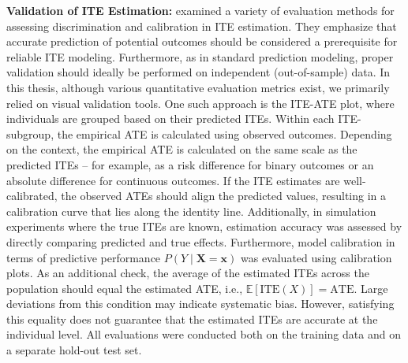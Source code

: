 \textbf{Validation of ITE Estimation:} \label{sec:ite_validation} \citet{hoogland2024} examined a variety of evaluation methods for assessing discrimination and calibration in ITE estimation. They emphasize that accurate prediction of potential outcomes should be considered a prerequisite for reliable ITE modeling. Furthermore, as in standard prediction modeling, proper validation should ideally be performed on independent (out-of-sample) data.
In this thesis, although various quantitative evaluation metrics exist, we primarily relied on visual validation tools. One such approach is the ITE-ATE plot, where individuals are grouped based on their predicted ITEs. Within each ITE-subgroup, the empirical ATE is calculated using observed outcomes. Depending on the context, the empirical ATE is calculated on the same scale as the predicted ITEs -- for example, as a risk difference for binary outcomes or an absolute difference for continuous outcomes. If the ITE estimates are well-calibrated, the observed ATEs should align the predicted values, resulting in a calibration curve that lies along the identity line. Additionally, in simulation experiments where the true ITEs are known, estimation accuracy was assessed by directly comparing predicted and true effects. Furthermore, model calibration in terms of predictive performance $P(Y \mid \mathbf{X} = \mathbf{x})$ was evaluated using calibration plots. As an additional check, the average of the estimated ITEs across the population should equal the estimated ATE, i.e., $\mathbb{E}[\text{ITE}(X)] = \text{ATE}$. Large deviations from this condition may indicate systematic bias. However, satisfying this equality does not guarantee that the estimated ITEs are accurate at the individual level. All evaluations were conducted both on the training data and on a separate hold-out test set.

% 
% 
% 



